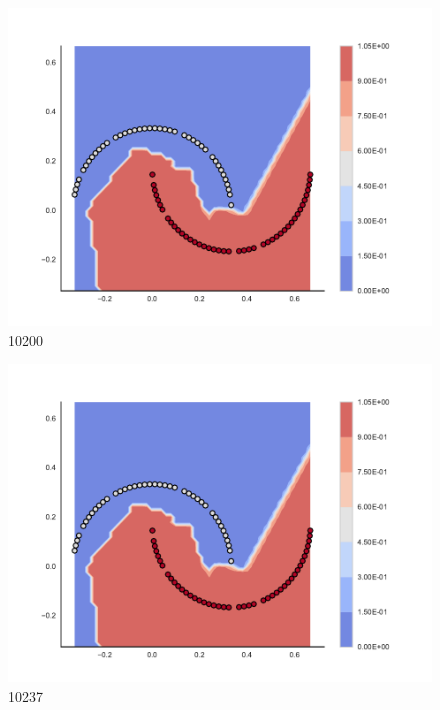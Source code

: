 \begin{subfigure}[b]{0.09\textwidth}
    \includegraphics[clip, trim=2.35cm 1.75cm 4.5cm 0cm,width=\textwidth]{img/convergence/10200.pdf}
    \caption{10200}
    \label{fig:convergence_10200}
\end{subfigure}
%
\begin{subfigure}[b]{0.09\textwidth}
    \includegraphics[clip, trim=2.35cm 1.75cm 4.5cm 0cm,width=\textwidth]{img/convergence/10237.pdf}
    \caption{10237}
    \label{fig:convergence_10237}
\end{subfigure}
%

